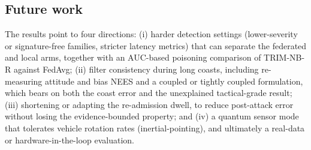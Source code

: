 \documentclass[12pt,a4paper]{article}
\begin{document}
\subsection{Future work}
The results point to four directions: (i) harder detection settings (lower-severity or signature-free families, stricter latency metrics) that can separate the federated and local arms, together with an AUC-based poisoning comparison of TRIM-NB-R against FedAvg; (ii) filter consistency during long coasts, including re-measuring attitude and bias NEES and a coupled or tightly coupled formulation, which bears on both the coast error and the unexplained tactical-grade result; (iii) shortening or adapting the re-admission dwell, to reduce post-attack error without losing the evidence-bounded property; and (iv) a quantum sensor mode that tolerates vehicle rotation rates (inertial-pointing), and ultimately a real-data or hardware-in-the-loop evaluation.



\end{document}

